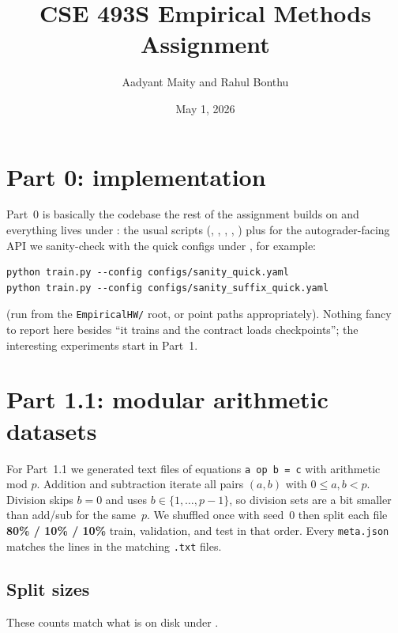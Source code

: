 \documentclass[11pt]{article}
\title{CSE 493S Empirical Methods Assignment\\}
\author{
Aadyant Maity and Rahul Bonthu
}
\date{May 1, 2026}
\begin{document}
\maketitle

\setcounter{secnumdepth}{-1}

\section{Part 0: implementation}

Part~0 is basically the codebase the rest of the assignment builds on and everything lives under : the usual scripts (, , , , ) plus  for the autograder-facing API we sanity-check with the quick configs under , for example:
\begin{verbatim}
python train.py --config configs/sanity_quick.yaml
python train.py --config configs/sanity_suffix_quick.yaml
\end{verbatim}
(run from the \texttt{EmpiricalHW/} root, or point paths appropriately). Nothing fancy to report here besides ``it trains and the contract loads checkpoints''; the interesting experiments start in Part~1.

\section{Part 1.1: modular arithmetic datasets}

For Part~1.1 we generated text files of equations \texttt{a op b = c} with arithmetic mod $p$. Addition and subtraction iterate all pairs $(a,b)$ with $0 \le a,b < p$. Division skips $b=0$ and uses $b \in \{1,\ldots,p-1\}$, so division sets are a bit smaller than add/sub for the same~$p$. We shuffled once with seed~$0$ then split each file \textbf{80\% / 10\% / 10\%} train, validation, and test in that order. Every \texttt{meta.json} matches the lines in the matching \texttt{.txt} files.

\subsection{Split sizes}

These counts match what is on disk under .
\end{document}
